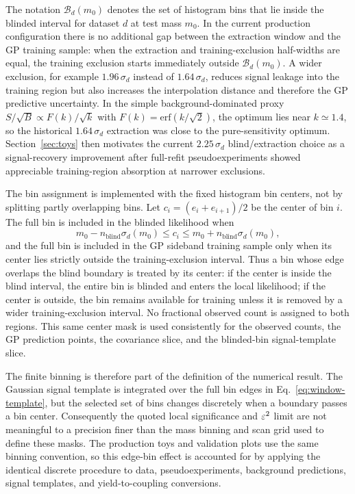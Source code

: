 The notation $\mathcal{B}_d(m_0)$ denotes the set of histogram bins that lie inside the
blinded interval for dataset $d$ at test mass $m_0$. In the current production
configuration there is no additional gap between the extraction window and the GP
training sample: when the extraction and training-exclusion half-widths are equal, the
training exclusion starts immediately outside $\mathcal{B}_d(m_0)$. A wider exclusion,
for example $1.96\,\sigma_d$ instead of $1.64\,\sigma_d$, reduces signal leakage into
the training region but also increases the interpolation distance and therefore the GP
predictive uncertainty. In the simple background-dominated proxy
$S/\sqrt{B}\propto F(k)/\sqrt{k}$ with $F(k)=\mathrm{erf}(k/\sqrt{2})$, the optimum lies
near $k\simeq1.4$, so the historical $1.64\,\sigma_d$ extraction was close to the
pure-sensitivity optimum. Section~\ref{sec:toys} then motivates the current
$2.25\,\sigma_d$ blind/extraction choice as a signal-recovery improvement after
full-refit pseudoexperiments showed appreciable training-region absorption at narrower
exclusions.

The bin assignment is implemented with the fixed histogram bin centers, not by splitting
partly overlapping bins. Let $c_i=(e_i+e_{i+1})/2$ be the center of bin $i$. The full
bin is included in the blinded likelihood when
\begin{equation}
m_0-n_{\mathrm{blind}}\sigma_d(m_0)
\le c_i \le
m_0+n_{\mathrm{blind}}\sigma_d(m_0),
\end{equation}
and the full bin is included in the GP sideband training sample only when its center
lies strictly outside the training-exclusion interval. Thus a bin whose edge overlaps
the blind boundary is treated by its center: if the center is inside the blind interval,
the entire bin is blinded and enters the local likelihood; if the center is outside,
the bin remains available for training unless it is removed by a wider
training-exclusion interval. No fractional observed count is assigned to both regions.
This same center mask is used consistently for the observed counts, the GP prediction
points, the covariance slice, and the blinded-bin signal-template slice.

The finite binning is therefore part of the definition of the numerical result. The
Gaussian signal template is integrated over the full bin edges in
Eq.~\eqref{eq:window-template}, but the selected set of bins changes discretely when a
boundary passes a bin center. Consequently the quoted local significance and
$\varepsilon^2$ limit are not meaningful to a precision finer than the mass binning and scan
grid used to define these masks. The production toys and validation plots use the same
binning convention, so this edge-bin effect is accounted for by applying the identical
discrete procedure to data, pseudoexperiments, background predictions, signal
templates, and yield-to-coupling conversions.

